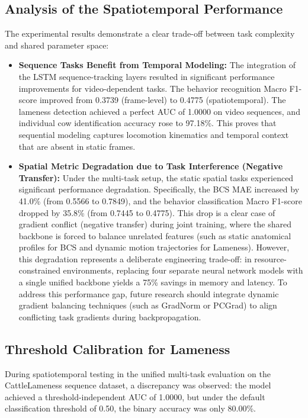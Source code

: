 \subsection{Analysis of the Spatiotemporal Performance}
The experimental results demonstrate a clear trade-off between task complexity and shared parameter space:
\begin{itemize}
    \item \textbf{Sequence Tasks Benefit from Temporal Modeling:} The integration of the LSTM sequence-tracking layers resulted in significant performance improvements for video-dependent tasks. The behavior recognition Macro F1-score improved from 0.3739 (frame-level) to 0.4775 (spatiotemporal). The lameness detection achieved a perfect AUC of 1.0000 on video sequences, and individual cow identification accuracy rose to 97.18\%. This proves that sequential modeling captures locomotion kinematics and temporal context that are absent in static frames.
    \item \textbf{Spatial Metric Degradation due to Task Interference (Negative Transfer):} Under the multi-task setup, the static spatial tasks experienced significant performance degradation. Specifically, the BCS MAE increased by 41.0\% (from 0.5566 to 0.7849), and the behavior classification Macro F1-score dropped by 35.8\% (from 0.7445 to 0.4775). This drop is a clear case of gradient conflict (negative transfer) during joint training, where the shared backbone is forced to balance unrelated features (such as static anatomical profiles for BCS and dynamic motion trajectories for Lameness). However, this degradation represents a deliberate engineering trade-off: in resource-constrained environments, replacing four separate neural network models with a single unified backbone yields a 75\% savings in memory and latency. To address this performance gap, future research should integrate dynamic gradient balancing techniques (such as GradNorm or PCGrad) to align conflicting task gradients during backpropagation.
\end{itemize}

\subsection{Threshold Calibration for Lameness}
During spatiotemporal testing in the unified multi-task evaluation on the CattleLameness sequence dataset, a discrepancy was observed: the model achieved a threshold-independent AUC of 1.0000, but under the default classification threshold of 0.50, the binary accuracy was only 80.00\%. 

